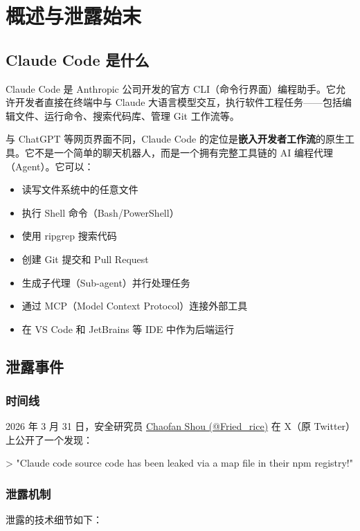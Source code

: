 \chapter{概述与泄露始末}

\section{Claude Code 是什么}

Claude Code 是 Anthropic 公司开发的官方 CLI（命令行界面）编程助手。它允许开发者直接在终端中与 Claude 大语言模型交互，执行软件工程任务——包括编辑文件、运行命令、搜索代码库、管理 Git 工作流等。

与 ChatGPT 等网页界面不同，Claude Code 的定位是\textbf{嵌入开发者工作流}的原生工具。它不是一个简单的聊天机器人，而是一个拥有完整工具链的 AI 编程代理（Agent）。它可以：

\begin{itemize}[nosep]
  \item 读写文件系统中的任意文件
  \item 执行 Shell 命令（Bash/PowerShell）
  \item 使用 ripgrep 搜索代码
  \item 创建 Git 提交和 Pull Request
  \item 生成子代理（Sub-agent）并行处理任务
  \item 通过 MCP（Model Context Protocol）连接外部工具
  \item 在 VS Code 和 JetBrains 等 IDE 中作为后端运行
\end{itemize}

\section{泄露事件}

\subsection{时间线}

2026 年 3 月 31 日，安全研究员 \href{https://x.com/Fried_rice}{Chaofan Shou (@Fried_rice)} 在 X（原 Twitter）上公开了一个发现：

> "Claude code source code has been leaked via a map file in their npm registry!"

\subsection{泄露机制}

泄露的技术细节如下：

